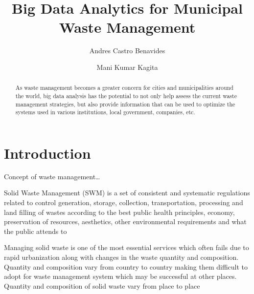 \documentclass[sigconf]{acmart}
\begin{document}
\title{Big Data Analytics for Municipal Waste Management}

\author{Andres Castro Benavides}

\author{Mani Kumar Kagita}


\renewcommand{\shortauthors}{B. Trovato et al.}


\begin{abstract}
As waste management becomes a greater concern for cities and municipalities around the world, big data analysis has the potential to not only help assess the current waste management strategies, but also provide information that can be used to optimize the systems used in various institutions, local government, companies, etc.

\end{abstract}




\maketitle

\section{Introduction}

Concept of waste management…

Solid Waste Management (SWM) is a set of consistent and systematic regulations related to control generation, storage, collection, transportation, processing and land filling of wastes according to the best public health principles, economy, preservation of resources, aesthetics, other environmental requirements and what the public attends to ~\cite{akbarpour2016}

Managing solid waste is one of the most essential services which often fails due to
rapid urbanization along with changes in the waste quantity and composition.
Quantity and composition vary from country to country making them difficult to
adopt for waste management system which may be successful at other places.
Quantity and composition of solid waste vary from place to place ~\cite{chandrappa2012} 
\end{document}
